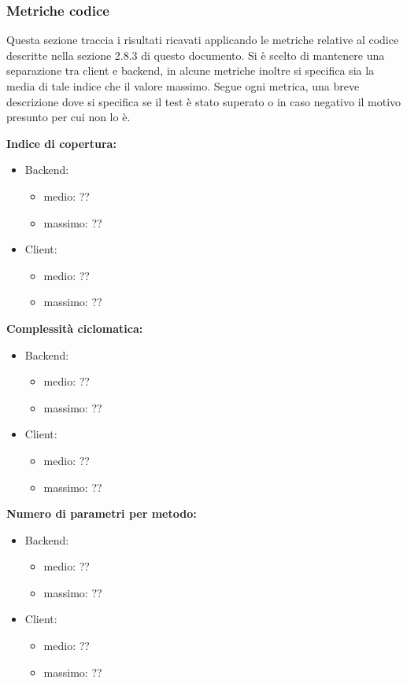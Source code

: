 		\subsubsection{Metriche codice}
			Questa sezione traccia i risultati ricavati applicando le metriche relative al codice descritte nella sezione 2.8.3 di questo documento. Si è scelto di mantenere una separazione tra client e backend, in alcune metriche inoltre si specifica sia la media di tale indice che il valore massimo. Segue ogni metrica, una breve descrizione dove si specifica se il test è stato superato o in caso negativo il motivo presunto per cui non lo è.\\
			\begin{description}
				\item \textbf{Indice di copertura:}				
				\begin{itemize}
						\item Backend:
							\begin{itemize}
								\item medio: ??
								\item massimo: ??
							\end{itemize}
						\item Client:
							\begin{itemize}
								\item medio: ??
								\item massimo: ??
							\end{itemize}
					\end{itemize}
				
				\item \textbf{Complessità ciclomatica:}
					\begin{itemize}
						\item Backend:
							\begin{itemize}
								\item medio: ??
								\item massimo: ??
							\end{itemize}
						\item Client:
							\begin{itemize}
								\item medio: ??
								\item massimo: ??
							\end{itemize}
					\end{itemize}
						
				\item \textbf{Numero di parametri per metodo:}
					\begin{itemize}
						\item Backend:
							\begin{itemize}
								\item medio: ??
								\item massimo: ??
							\end{itemize}
						\item Client:
							\begin{itemize}
								\item medio: ??
								\item massimo: ??
							\end{itemize}
					\end{itemize}
					

\end{description}
